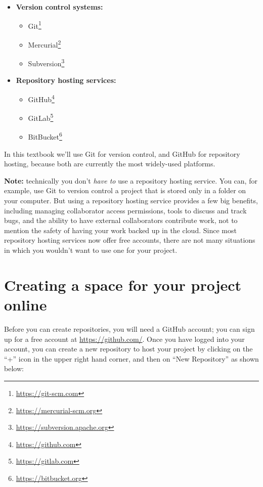 \documentclass[
]{krantz}
\providecommand{\tightlist}{%
  \setlength{\itemsep}{0pt}\setlength{\parskip}{0pt}}
\renewenvironment{quote}{\begin{VF}}{\end{VF}}
\renewcommand{\href}[2]{#2\footnote{\url{#1}}}
\begin{document}
\begin{itemize}
\tightlist
\item
  \textbf{Version control systems:}

  \begin{itemize}
  \tightlist
  \item
    \href{https://git-scm.com}{Git}
  \item
    \href{https://mercurial-scm.org}{Mercurial}
  \item
    \href{https://subversion.apache.org}{Subversion}
  \end{itemize}
\item
  \textbf{Repository hosting services:}

  \begin{itemize}
  \tightlist
  \item
    \href{https://github.com}{GitHub}
  \item
    \href{https://gitlab.com}{GitLab}
  \item
    \href{https://bitbucket.org}{BitBucket}
  \end{itemize}
\end{itemize}

In this textbook we'll use Git for version control, and GitHub for repository hosting, because both are currently the most widely-used platforms.

\begin{quote}
\textbf{Note:} technically you don't \emph{have to} use a repository hosting service. You can, for example, use Git to version control a project
that is stored only in a folder on your computer. But using a repository hosting service provides a few big benefits, including managing collaborator access permissions,
tools to discuss and track bugs, and the ability to have external collaborators contribute work, not to mention the safety of having your work backed up in the cloud. Since most
repository hosting services now offer free accounts, there are not many situations in which you wouldn't want to use one for your project.
\end{quote}

\hypertarget{creating-a-space-for-your-project-online}{%
\section{Creating a space for your project online}\label{creating-a-space-for-your-project-online}}

Before you can create repositories, you will need a GitHub account;
you can sign up for a free account at \url{https://github.com/}.
Once you have logged into your account, you can create a new repository to host your project
by clicking on the ``+'' icon in the upper right
hand corner, and then on ``New Repository'' as shown below:
\end{document}
